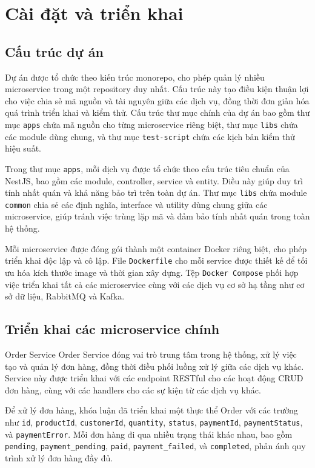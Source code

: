 \section{Cài đặt và triển khai}

\subsection{Cấu trúc dự án}
Dự án được tổ chức theo kiến trúc monorepo, cho phép quản lý nhiều microservice trong một repository duy nhất. Cấu trúc này tạo điều kiện thuận lợi cho việc chia sẻ mã nguồn và tài nguyên giữa các dịch vụ, đồng thời đơn giản hóa quá trình triển khai và kiểm thử. Cấu trúc thư mục chính của dự án bao gồm thư mục \texttt{apps} chứa mã nguồn cho từng microservice riêng biệt, thư mục \texttt{libs} chứa các module dùng chung, và thư mục \texttt{test-script} chứa các kịch bản kiểm thử hiệu suất.

Trong thư mục \texttt{apps}, mỗi dịch vụ được tổ chức theo cấu trúc tiêu chuẩn của NestJS, bao gồm các module, controller, service và entity. Điều này giúp duy trì tính nhất quán và khả năng bảo trì trên toàn dự án. Thư mục \texttt{libs} chứa module \texttt{common} chia sẻ các định nghĩa, interface và utility dùng chung giữa các microservice, giúp tránh việc trùng lặp mã và đảm bảo tính nhất quán trong toàn hệ thống.

Mỗi microservice được đóng gói thành một container Docker riêng biệt, cho phép triển khai độc lập và cô lập. File \texttt{Dockerfile} cho mỗi service được thiết kế để tối ưu hóa kích thước image và thời gian xây dựng. Tệp \texttt{Docker Compose} phối hợp việc triển khai tất cả các microservice cùng với các dịch vụ cơ sở hạ tầng như cơ sở dữ liệu, RabbitMQ và Kafka.

\subsection{Triển khai các microservice chính}

Order Service
Order Service đóng vai trò trung tâm trong hệ thống, xử lý việc tạo và quản lý đơn hàng, đồng thời điều phối luồng xử lý giữa các dịch vụ khác. Service này được triển khai với các endpoint RESTful cho các hoạt động CRUD đơn hàng, cùng với các handlers cho các sự kiện từ các dịch vụ khác.

Để xử lý đơn hàng, khóa luận đã triển khai một thực thể Order với các trường như \texttt{id}, \texttt{productId}, \texttt{customerId}, \texttt{quantity}, \texttt{status}, \texttt{paymentId}, \texttt{paymentStatus}, và \texttt{paymentError}. Mỗi đơn hàng đi qua nhiều trạng thái khác nhau, bao gồm \texttt{pending}, \texttt{payment\_pending}, \texttt{paid}, \texttt{payment\_failed}, và \texttt{completed}, phản ánh quy trình xử lý đơn hàng đầy đủ.

